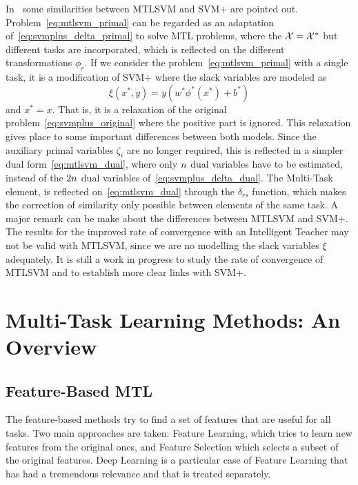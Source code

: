 In~\cite{LiangC08} some similarities between MTLSVM and SVM+ are pointed out. Problem~\eqref{eq:mtlsvm_primal} can be regarded as an adaptation of~\eqref{eq:svmplus_delta_primal} to solve MTL problems, where the $\mathcal{X} = \mathcal{X}^*$ but different tasks are incorporated, which is reflected on the different transformations $\phi_r$.
If we consider the problem~\eqref{eq:mtlsvm_primal} with a single task, it is a modification of SVM+ where the slack variables are modeled as
$$ \xi(x^*, y) = y (w^* \phi^*(x^*) + b^*)  $$
and $x^* = x$. That is, it is a relaxation of the original problem~\eqref{eq:svmplus_original} where the positive part is ignored.
This relaxation gives place to some important differences between both models. Since the auxiliary primal variables $\zeta_i$ are no longer required, this is reflected in a simpler dual form~\eqref{eq:mtlsvm_dual}, where only $n$ dual variables have to be estimated, instead of the $2n$ dual variables of~\eqref{eq:svmplus_delta_dual}.
The Multi-Task element, is reflected on~\eqref{eq:mtlsvm_dual} through the $\delta_{rs}$ function, which makes the correction of similarity only possible between elements of the same task.
%
A major remark can be make about the differences between MTLSVM and SVM+. The results for the improved rate of convergence with an Intelligent Teacher may not be valid with MTLSVM, since we are no modelling the slack variables $\xi$ adequately. 
It is still a work in progress to study the rate of convergence of MTLSVM and to establish more clear links with SVM+.




\section{Multi-Task Learning Methods: An Overview}

\subsection{Feature-Based MTL}
The feature-based methods try to find a set of features that are useful for all tasks. Two main approaches are taken: Feature Learning, which tries to learn new features from the original ones, and Feature Selection which selects a subset of the original features.
Deep Learning is a particular case of Feature Learning that has had a tremendous relevance and that is treated separately. 


